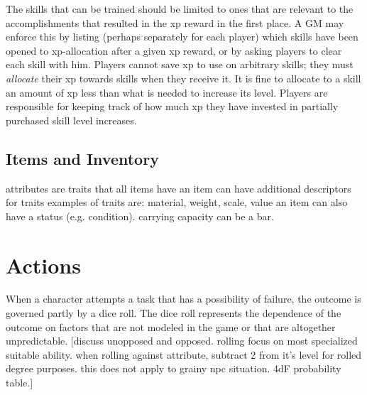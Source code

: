 \documentclass[12pt]{article}
\newcommand{\notes}[1]{{\color{Tan} #1}}
\begin{document}
The skills that can be trained should be limited to ones that are relevant to the accomplishments that resulted in the xp reward in the first place.
A GM may enforce this by listing 
(perhaps separately for each player)
which skills have been opened
to xp-allocation after a given xp reward,
or by asking players to clear each skill with him.
Players cannot save xp to use on arbitrary skills; they must \emph{allocate} their xp towards skills when they receive it.
It is fine to allocate to a skill an amount of xp less than what is needed to increase its level.
Players are responsible for keeping track of how much xp they have invested in partially purchased skill level increases.






\subsection{Items and Inventory} \label{sec:items}
\notes{attributes are traits that all items have
an item can have additional descriptors for traits
examples of traits are: material, weight, scale, value
an item can also have a status (e.g. condition).
carrying capacity can be a bar.}


\section{Actions}\label{sec:actions}
When a character attempts a task that has a possibility of failure, the outcome is governed partly by a dice roll.
The dice roll represents the dependence of the outcome on factors that are not modeled in the game or that are altogether unpredictable.
\notes{[discuss unopposed and opposed. rolling focus on most specialized suitable ability. when rolling against attribute, subtract 2 from it's level for rolled degree purposes. this does not apply to grainy npc situation. 4dF probability table.]}
\end{document}
